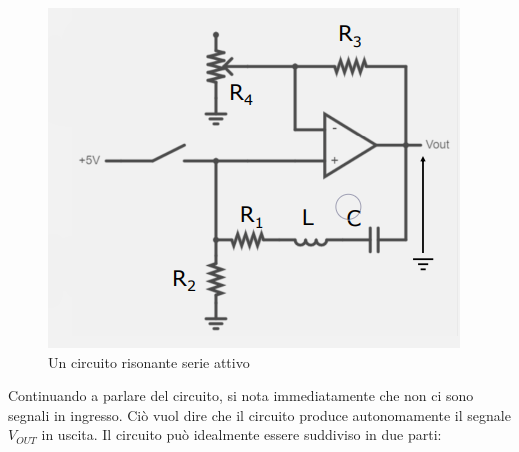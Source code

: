 \documentclass{article}
\begin{document}
\begin{figure}[h]
  \centering
  \includegraphics[scale=0.7]{IM_circuito_risonante_serie_attivo}
  \caption{Un circuito risonante serie attivo}
  \label{Schema_circuito_risonante_serie_attivo}
\end{figure}

Continuando a parlare del circuito, si nota immediatamente che non ci sono segnali in ingresso. Ciò vuol dire che il circuito produce autonomamente il segnale $V_{OUT}$ in uscita. Il circuito può idealmente essere suddiviso in due parti:
\end{document}
